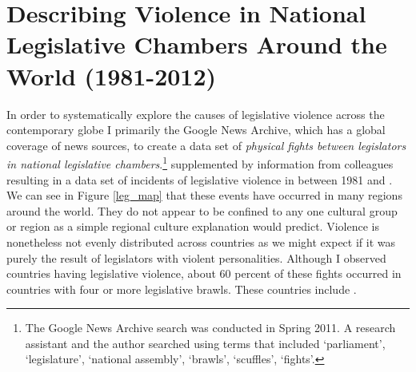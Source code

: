 \documentclass[a4paper]{article}\usepackage[]{graphicx}\usepackage[]{color}
\begin{document}
\section{Describing Violence in National Legislative Chambers Around the World (1981-2012)}

In order to  systematically explore the causes of legislative violence across the contemporary globe I primarily  the Google News Archive, which has a global coverage of news sources,  to create a data set of {\emph{physical fights between legislators in national legislative chambers}}.\footnote{The Google News Archive search was conducted in Spring 2011. A research assistant and the author searched using terms that included `parliament', `legislature', `national assembly', `brawls', `scuffles', `fights'. }  supplemented by information from colleagues resulting in a data set of  incidents of legislative violence in   between 1981 and . We can see in Figure \ref{leg_map} that these events have occurred in many regions around the world. They do not appear to be confined to any one cultural group or region as a simple regional culture explanation would predict. Violence is nonetheless not evenly distributed across countries as we might expect if it was purely the result of legislators with violent personalities. Although I observed  countries having legislative violence, about 60 percent of these fights occurred in  countries with four or more legislative brawls. These countries include\add{:} .
\end{document}
